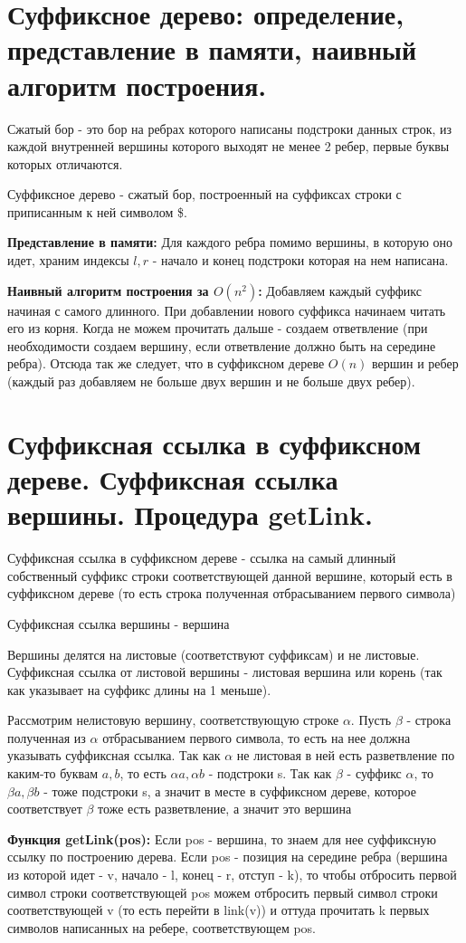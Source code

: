 \section{Суффиксное дерево: определение, представление в памяти, наивный алгоритм построения.}
\par \Def Сжатый бор - это бор на ребрах которого написаны подстроки данных строк, из каждой внутренней вершины которого выходят не менее 2 ребер, первые буквы которых отличаются.
\par \Def Суффиксное дерево - сжатый бор, построенный на суффиксах строки с приписанным к ней символом \$.
\par \textbf{Представление в памяти:} Для каждого ребра помимо вершины, в которую оно идет, храним индексы $l, r$ - начало и конец подстроки которая на нем написана.
\par \textbf{Наивный алгоритм построения за $O(n^2)$:} Добавляем каждый суффикс начиная с самого длинного. При добавлении нового суффикса начинаем читать его из корня. Когда не можем прочитать дальше - создаем ответвление (при необходимости создаем вершину, если ответвление должно быть на середине ребра). Отсюда так же следует, что в суффиксном дереве $O(n)$ вершин и ребер (каждый раз добавляем не больше двух вершин и не больше двух ребер).
\newpage{}

\section{Суффиксная ссылка в суффиксном дереве. Суффиксная ссылка вершины. Процедура getLink.}
\par \Def Суффиксная ссылка в суффиксном дереве - ссылка на самый длинный собственный суффикс строки соответствующей данной вершине, который есть в суффиксном дереве (то есть строка полученная отбрасыванием первого символа)
\par \Statement Суффиксная ссылка вершины - вершина
\par \Proof Вершины делятся на листовые (соответствуют суффиксам) и не листовые. Суффиксная ссылка от листовой вершины - листовая вершина или корень (так как указывает на суффикс длины на 1 меньше).
\par Рассмотрим нелистовую вершину, соответствующую строке $\alpha$. Пусть $\beta$ - строка полученная из $\alpha$ отбрасыванием первого символа, то есть на нее должна указывать суффиксная ссылка. Так как $\alpha$ не листовая в ней есть разветвление по каким-то буквам $a, b$, то есть $\alpha a, \alpha b$ - подстроки s. Так как $\beta$ - суффикс $\alpha$, то $\beta a, \beta b$ - тоже подстроки s, а значит в месте в суффиксном дереве, которое соответствует $\beta$ тоже есть разветвление, а значит это вершина \EndProof
\par \textbf{Функция getLink(pos):} Если pos - вершина, то знаем для нее суффиксную ссылку по построению дерева. Если pos - позиция на середине ребра (вершина из которой идет - v, начало - l, конец - r, отступ - k), то чтобы отбросить первой символ строки соответствующей pos можем отбросить первый символ строки соответствующей v (то есть перейти в link(v)) и оттуда прочитать k первых символов написанных на ребере, соответствующем pos.
\newpage{}

